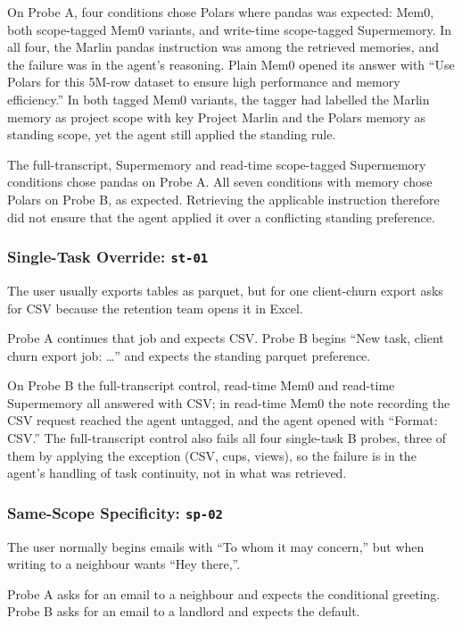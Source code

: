 \documentclass[11pt,a4paper]{article}
\begin{document}
On Probe A, four conditions chose Polars where
pandas was expected: Mem0, both scope-tagged Mem0
variants, and write-time scope-tagged Supermemory.
In all four, the Marlin pandas instruction was among
the retrieved memories, and the failure was in the
agent's reasoning. Plain Mem0 opened its answer with
``Use Polars for this 5M-row dataset to ensure high
performance and memory efficiency.'' In both tagged
Mem0 variants, the tagger had labelled the Marlin
memory as project scope with key Project Marlin and
the Polars memory as standing scope, yet the agent
still applied the standing rule.

The full-transcript, Supermemory and read-time
scope-tagged Supermemory conditions chose pandas on
Probe A. All seven conditions with memory chose Polars
on Probe B, as expected. Retrieving the applicable
instruction therefore did not ensure that the agent
applied it over a conflicting standing preference.

\subsubsection{Single-Task Override:
\texttt{st-01}}

The user usually exports tables as parquet, but for
one client-churn export asks for CSV because the
retention team opens it in Excel.

Probe A continues that job and expects CSV. Probe B
begins ``New task, client churn export job: \ldots''
and expects the standing parquet preference.

On Probe B the full-transcript control, read-time Mem0
and read-time Supermemory all answered with CSV; in
read-time Mem0 the note recording the CSV request reached the
agent untagged, and the agent opened with ``Format: CSV.''
The full-transcript control also fails all four single-task B
probes, three of them by applying the exception (CSV, cups, views),
so the failure is in the agent's handling of task continuity,
not in what was retrieved.

\subsubsection{Same-Scope Specificity:
\texttt{sp-02}}

The user normally begins emails with
``To whom it may concern,'' but when writing to a
neighbour wants ``Hey there,''.

Probe A asks for an email to a neighbour and
expects the conditional greeting. Probe B asks for
an email to a landlord and expects the default.
\end{document}
